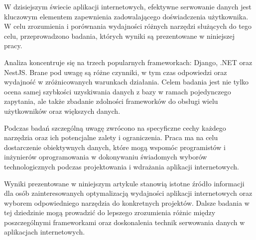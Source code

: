 W dzisiejszym świecie aplikacji internetowych, efektywne serwowanie danych jest kluczowym elementem zapewnienia zadowalającego doświadczenia użytkownika.
W celu zrozumienia i porównania wydajności różnych narzędzi służących do tego celu, przeprowadzono badania, których wyniki są prezentowane w niniejszej pracy.

Analiza koncentruje się na trzech popularnych frameworkach: Django, .NET oraz NestJS.
Brane pod uwagę są różne czynniki, w tym czas odpowiedzi oraz wydajność w zróżnicowanych warunkach działania.
Celem badania jest nie tylko ocena samej szybkości uzyskiwania danych z bazy w ramach pojedynczego zapytania, ale także zbadanie zdolności frameworków do obsługi wielu użytkowników oraz większych danych.

Podczas badań szczególną uwagę zwrócono na specyficzne cechy każdego narzędzia oraz ich potencjalne zalety i ograniczenia. Praca ma na celu dostarczenie obiektywnych danych, które mogą wspomóc programistów i inżynierów oprogramowania w dokonywaniu świadomych wyborów technologicznych podczas projektowania i wdrażania aplikacji internetowych.

Wyniki prezentowane w niniejszym artykule stanowią istotne źródło informacji dla osób zainteresowanych optymalizacją wydajności aplikacji internetowych oraz wyborem odpowiedniego narzędzia do konkretnych projektów.
Dalsze badania w tej dziedzinie mogą prowadzić do lepszego zrozumienia różnic między poszczególnymi frameworkami oraz doskonalenia technik serwowania danych w aplikacjach internetowych.
